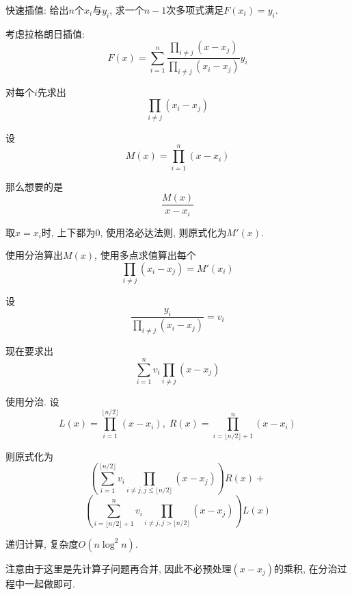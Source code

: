 快速插值: 给出$n$个$x_i$与$y_i$, 求一个$n-1$次多项式满足$F(x_i)=y_i$.

考虑拉格朗日插值: 
$$F(x)=\sum_{i=1}^n\frac{\prod_{i\neq j}(x-x_j)}{\prod_{i\neq j}(x_i-x_j)}y_i$$

对每个$i$先求出
$$\prod_{i\neq j}(x_i-x_j)$$

设
$$M(x)=\prod_{i=1}^{n}(x-x_i)$$

那么想要的是
$$\frac{M(x)}{x-x_i}$$

取$x=x_i$时, 上下都为0, 使用洛必达法则, 则原式化为$M'(x)$.

使用分治算出$M(x)$, 使用多点求值算出每个
$$\prod_{i\neq j}(x_i-x_j)=M'(x_i)$$

设
$$\frac{y_i}{\prod_{i\neq j}(x_i-x_j)}=v_i$$

现在要求出$$\sum_{i=1}^{n}v_i\prod_{i\neq j}(x-x_j)$$

使用分治. 设
$$L(x)=\prod_{i=1}^{\lfloor n/2\rfloor}(x-x_i), \; R(x)=\prod_{i=\lfloor n/2\rfloor+1}^n(x-x_i)$$

则原式化为
$$\left( \sum_{i=1}^{\lfloor n/2\rfloor}v_i\prod_{i\neq j,j\leq\lfloor n/2\rfloor}(x-x_j)\right)R(x)+$$
$$\left( \sum_{i=\lfloor n/2\rfloor+1}^{n}v_i\prod_{i\neq j,j>\lfloor n/2\rfloor}(x-x_j)\right)L(x)$$

递归计算, 复杂度$O(n\log^2n)$.

注意由于这里是先计算子问题再合并, 因此不必预处理$(x - x_j)$的乘积, 在分治过程中一起做即可.